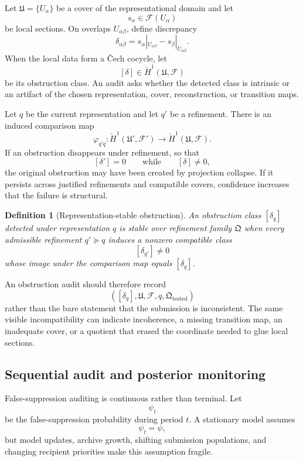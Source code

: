 \documentclass[11pt]{article}
\newtheorem{definition}{Definition}[section]
\theoremstyle{definition}
\begin{document}
Let \(\mathfrak{U}=\{U_\alpha\}\) be a cover of the representational domain and let
\[
s_\alpha\in\mathcal{F}(U_\alpha)
\]
be local sections. On overlaps \(U_{\alpha\beta}\), define discrepancy
\[
\delta_{\alpha\beta}
=
s_\alpha|_{U_{\alpha\beta}}
-
s_\beta|_{U_{\alpha\beta}}.
\]
When the local data form a Čech cocycle, let
\[
[\delta]\in\check{H}^{1}(\mathfrak{U},\mathcal{F})
\]
be its obstruction class. An audit asks whether the detected class is intrinsic or an artifact of the chosen representation, cover, reconstruction, or transition maps.

Let \(q\) be the current representation and let \(q'\) be a refinement. There is an induced comparison map
\[
\varphi_{q'q}:
\check{H}^{1}(\mathfrak{U}',\mathcal{F}')
\longrightarrow
\check{H}^{1}(\mathfrak{U},\mathcal{F}).
\]
If an obstruction disappears under refinement, so that
\[
[\delta'] = 0
\qquad
\text{while}
\qquad
[\delta]\neq0,
\]
the original obstruction may have been created by projection collapse. If it persists across justified refinements and compatible covers, confidence increases that the failure is structural.

\begin{definition}[Representation-stable obstruction]
An obstruction class \([\delta_q]\) detected under representation \(q\) is stable over refinement family \(\mathfrak{Q}\) when every admissible refinement \(q'\succeq q\) induces a nonzero compatible class
\[
[\delta_{q'}]\neq0
\]
whose image under the comparison map equals \([\delta_q]\).
\end{definition}

An obstruction audit should therefore record
\[
\left(
[\delta_q],
\mathfrak{U},
\mathcal{F},
q,
\mathfrak{Q}_{\mathrm{tested}}
\right)
\]
rather than the bare statement that the submission is inconsistent. The same visible incompatibility can indicate incoherence, a missing transition map, an inadequate cover, or a quotient that erased the coordinate needed to glue local sections.

\subsection{Sequential audit and posterior monitoring}

False-suppression auditing is continuous rather than terminal. Let
\[
\psi_t
\]
be the false-suppression probability during period \(t\). A stationary model assumes
\[
\psi_t=\psi,
\]
but model updates, archive growth, shifting submission populations, and changing recipient priorities make this assumption fragile.
\end{document}
